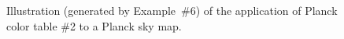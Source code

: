 \begin{figure}[h!]
\caption{%
\label{page:planck_colors_217}%
\label{fig:planck_colors_217}%
Illustration (generated by 
Example~\#6) of the application of Planck color table
\#2  to a Planck sky map.}
\end{figure}

